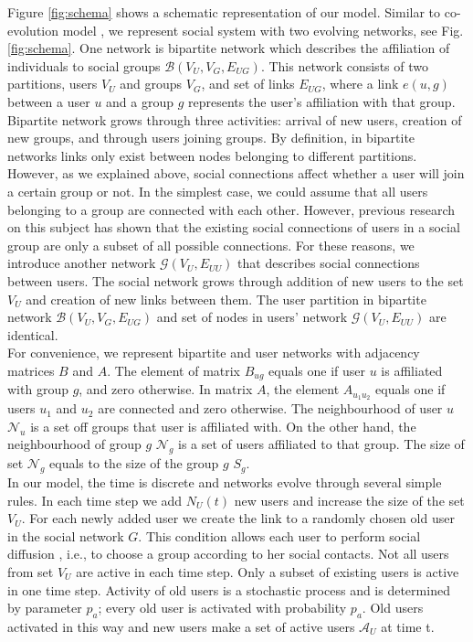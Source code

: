 Figure \ref{fig:schema} shows a schematic representation of our model. Similar to co-evolution model \cite{zheleva2009co}, we represent social system with two evolving networks, see Fig. \ref{fig:schema}. One network is bipartite network which describes the affiliation of individuals to social groups $\mathcal{B}(V_{U}, V_{G}, E_{UG})$. This network consists of two partitions, users $V_{U}$ and groups $V_{G}$, and set of links $E_{UG}$, where a link $e(u,g)$ between a user $u$ and a group $g$ represents the user's affiliation with that group. Bipartite network grows through three activities: arrival of new users, creation of new groups, and through users joining groups. By definition, in bipartite networks links only exist between nodes belonging to different partitions. However, as we explained above, social connections affect whether a user will join a certain group or not. In the simplest case, we could assume that all users belonging to a group are connected with each other. However, previous research on this subject \cite{ smiljanic2017associative, backstrom2006group, zheleva2009co} has shown that the existing social connections of users in a social group are only a subset of all possible connections. For these reasons, we introduce another network $\mathcal{G}(V_{U},E_{UU})$ that describes social connections between users. The social network grows through addition of new users to the set $V_{U}$ and creation of new links between them. The user partition in bipartite network $\mathcal{B}(V_{U}, V_{G}, E_{UG})$ and set of nodes in users' network $\mathcal{G}(V_{U}, E_{UU})$ are identical.\\

For convenience, we represent bipartite and user networks with adjacency matrices $B$ and $A$. The element of matrix $B_{ug}$ equals one if user $u$ is affiliated with group $g$, and zero otherwise. In matrix $A$, the element $A_{u_{1}u_{2}}$ equals one if users $u_{1}$ and $u_{2}$ are connected and zero otherwise. The neighbourhood of user $u$ $\mathcal{N}_{u}$ is a set off groups that user is affiliated with. On the other hand, the neighbourhood of group $g$ $\mathcal{N}_{g}$ is a set of users affiliated to that group. The size of set $\mathcal{N}_g$ equals to the size of the group $g$ $S_{g}$.\\

In our model, the time is discrete and networks evolve through several simple rules. In each time step we add $N_{U}(t)$ new users and increase the size of the set $V_{U}$. For each newly added user we create the link to a randomly chosen old user in the social network $G$. This condition allows each user to perform social diffusion \cite{kairam2012life}, i.e., to choose a group according to her social contacts. 
Not all users from set $V_{U}$ are active in each time step. Only a subset of existing users is active in one time step. Activity of old users is a stochastic process and is determined by parameter $p_{a}$; every old user is activated with probability $p_{a}$. Old users activated in this way and new users make a set of active users $\mathcal{A}_{U}$ at time t.\\ 

